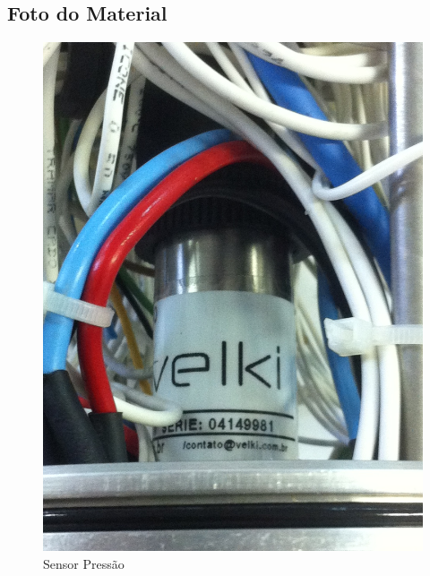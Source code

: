 \subsection{Foto do Material}
\begin{figure}[H]
 \centering
 \includegraphics[width=1\columnwidth]{Pressao/foto}
 \caption{Sensor Pressão}
\end{figure}

